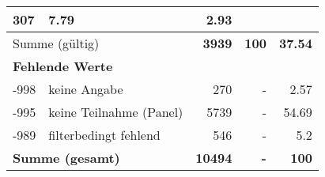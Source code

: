 \begin{longtable}{lXrrr}
       \num{307} &
       \num[round-mode=places,round-precision=2]{7,79} &
         \num[round-mode=places,round-precision=2]{2,93} \\
     \midrule
     \multicolumn{2}{l}{Summe (gültig)} &
       \textbf{\num{3939}} &
     \textbf{100} &
       \textbf{\num[round-mode=places,round-precision=2]{37,54}} \\
     \multicolumn{5}{l}{\textbf{Fehlende Werte}}\\
       -998 &
       keine Angabe &
         \num{270} &
        - &
         \num[round-mode=places,round-precision=2]{2,57} \\
       -995 &
       keine Teilnahme (Panel) &
         \num{5739} &
        - &
         \num[round-mode=places,round-precision=2]{54,69} \\
       -989 &
       filterbedingt fehlend &
         \num{546} &
        - &
         \num[round-mode=places,round-precision=2]{5,2} \\
     \midrule
     \multicolumn{2}{l}{\textbf{Summe (gesamt)}} &
          \textbf{\num{10494}} &
        \textbf{-} &
        \textbf{100} \\
     \bottomrule
     \end{longtable}
     
